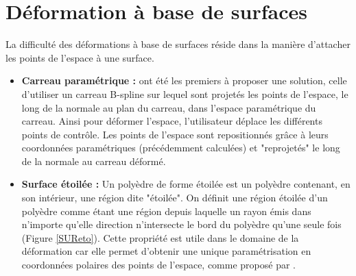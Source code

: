 \section{Déformation à base de surfaces}
La difficulté des déformations à base de surfaces réside dans la
manière d'attacher les points de l'espace à une surface.

\begin{itemize}
\item{\textbf{Carreau paramétrique :}} \cite{JLQ96} ont été les
  premiers à proposer une solution, celle d'utiliser un carreau
  B-spline sur lequel sont projetés les points de l'espace, le long de
  la normale au plan du carreau, dans l'espace paramétrique du
  carreau. Ainsi pour déformer l'espace, l'utilisateur déplace les
  différents points de contrôle. Les points de l'espace sont
  repositionnés grâce à leurs coordonnées paramétriques (précédemment
  calculées) et "reprojetés" le long de la normale au carreau déformé.
\item{\textbf{Surface étoilée :}} Un polyèdre de forme étoilée est un
  polyèdre contenant, en son intérieur, une région dite "étoilée". On
  définit une région étoilée d'un polyèdre comme étant une région
  depuis laquelle un rayon émis dans n'importe qu'elle direction
  n'intersecte le bord du polyèdre qu'une seule fois (Figure
  \ref{SUReto}). Cette propriété est utile dans le domaine de la
  déformation car elle permet d'obtenir une unique paramétrisation en
  coordonnées polaires des points de l'espace, comme proposé par
  \cite{JL00}.


\end{itemize}
